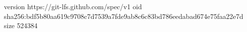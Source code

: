 version https://git-lfs.github.com/spec/v1
oid sha256:bdf5b80aa619c9708c7d7539a7fde9ab8c6c83bd786eedabad674e75faa22e7d
size 524384
